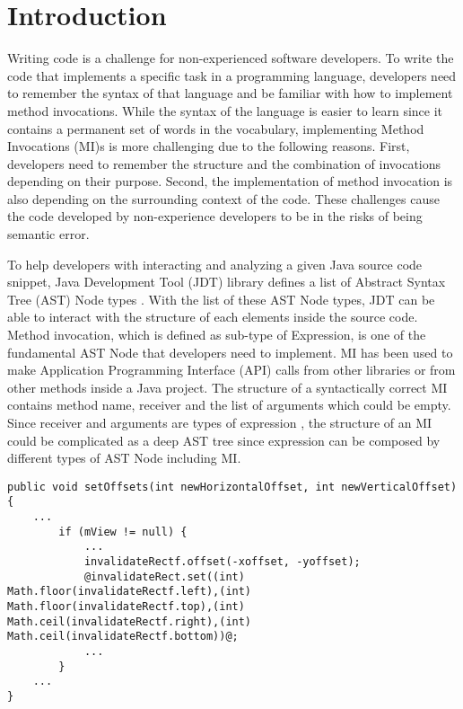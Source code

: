 \section{Introduction}
Writing code is a challenge for non-experienced software developers. To write the code that implements a specific task in a programming language, developers need to remember the syntax of that language and be familiar with how to implement method invocations. While the syntax of the language is easier to learn since it contains a permanent set of words in the vocabulary, implementing Method Invocations (MI)s is more challenging due to the following reasons. First, developers need to remember the structure and the combination of invocations depending on their purpose. Second, the implementation of method invocation is also depending on the surrounding context of the code. These challenges cause the code developed by non-experience developers to be in the risks of being semantic error.

To help developers with interacting and analyzing a given Java source code snippet, Java Development Tool (JDT) library defines a list of Abstract Syntax Tree (AST) Node types \cite{id:ASTDocumentation}. With the list of these AST Node types, JDT can be able to interact with the structure of each elements inside the source code. Method invocation, which is defined as sub-type of Expression, is one of the fundamental AST Node that developers need to implement. MI has been used to make Application Programming Interface (API) calls from other libraries or from other methods inside a Java project.  The structure of a syntactically correct MI contains method name, receiver and the list of arguments which could be empty. Since receiver and arguments are types of expression \cite{id:ASTDocumentation}, the structure of an MI could be complicated as a deep AST tree since expression can be composed by different types of AST Node including MI. 

\begin{lstlisting}[basicstyle=\tiny,caption={Example of invocation of API \texttt{java.awt.Rectangle.set()} in \cite{id:Example11Complicate}},label={Example11Complicate}]
 public void setOffsets(int newHorizontalOffset, int newVerticalOffset) {
    ...
        if (mView != null) {
            ...
            invalidateRectf.offset(-xoffset, -yoffset);
            @invalidateRect.set((int) Math.floor(invalidateRectf.left),(int) Math.floor(invalidateRectf.top),(int) Math.ceil(invalidateRectf.right),(int) Math.ceil(invalidateRectf.bottom))@;
            ...
        }
    ...
}
\end{lstlisting}

